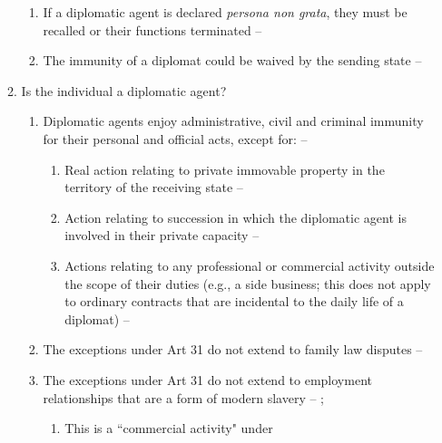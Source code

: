 \begin{enumerate}
\begin{enumerate}
\begin{enumerate}
            \item If a diplomatic agent is declared \textit{persona non grata}, they must be recalled or their functions terminated -- 
            \item The immunity of a diplomat could be waived by the sending state -- 
        \end{enumerate}
        \item Is the individual a diplomatic agent?
        \begin{enumerate}
            \item Diplomatic agents enjoy administrative, civil and criminal immunity for their personal and official acts, except for: -- 
            \begin{enumerate}
                \item Real action relating to private immovable property in the territory of the receiving state -- 
                \item Action relating to succession in which the diplomatic agent is involved in their private capacity -- 
                \item Actions relating to any professional or commercial activity outside the scope of their duties (e.g., a side business; this does not apply to ordinary contracts that are incidental to the daily life of a diplomat) -- 
            \end{enumerate}
            \item The exceptions under Art 31 do not extend to family law disputes -- 
            \item The exceptions under Art 31 do not extend to employment relationships that are a form of modern slavery -- ; 
            \begin{enumerate}
                \item This is a ``commercial activity" under 

\end{enumerate}
\end{enumerate}
\end{enumerate}
\end{enumerate}
